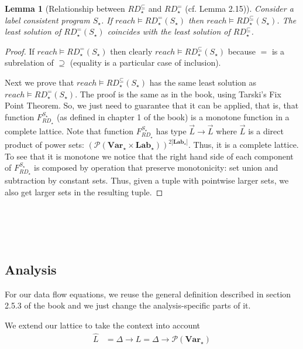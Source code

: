 \documentclass[a4wide,12pt]{article}
\theoremstyle{definition}
\theoremstyle{plain}
\newtheorem{lemma}[theo]{Lemma}
\theoremstyle{remark}
\def\pset#1{\mathcal{P}(#1)}
\def\Lab {\mathbf{Lab}}
\def\Var {\mathbf{Var}}
\begin{document}
\begin{lemma}[Relationship between $RD_\star^\subseteq$ and $RD_\star^=$ (cf. Lemma 2.15)]
Consider a label consistent program $S_\star$.  If $reach \models RD_\star^=(S_\star)$
then $reach \models RD_\star^\subseteq(S_\star)$. The least solution of $RD_\star^=(S_\star)$ coincides
with the least solution of $RD_\star^\subseteq$.
\end{lemma}
\begin{proof}
If $reach \models RD_\star^=(S_\star)$
then clearly $reach \models RD^\subseteq_\star(S_\star)$ because $=$ is a subrelation of $\supseteq$
(equality is a particular case of inclusion).

Next we prove that $reach \models RD_\star^\subseteq(S_\star)$ has the same least solution
as  $reach \models RD_\star^=(S_\star)$.
The proof is the same as in the book, using Tarski's Fix Point Theorem.
So, we just need to guarantee that it can be applied, that is, that 
function $F_{RD_\star}^{S_\star}$ (as defined in chapter 1 of the book) is a monotone
function in a complete lattice.
Note that function $F_{RD_\star}^{S_\star}$
has type $\vec{L} \to \vec{L}$ where $\vec{L}$ is a direct product
of power sets: $(\pset{\Var_\star \times \Lab_\star})^{2|\Lab_\star|}$. Thus, it is a complete lattice. 
To see that it is monotone
we  notice that the right hand side of each component of $F_{RD_\star}^{S_\star}$
is composed by operation that preserve monotonicity: set union and subtraction
by constant sets.
Thus, given a tuple with pointwise
larger sets, we also get larger sets in the resulting tuple.
\end{proof}


\section{~} 

\subsection{Analysis}

For our data flow equations, we reuse the general definition 
described in section 2.5.3 of the book and we just change the analysis-specific parts of it.

We extend our lattice to take the context into account
\begin{align*}
\widehat{L} & = \Delta \to L = \Delta \to \pset{\Var_\star}
\end{align*}
\end{document}
